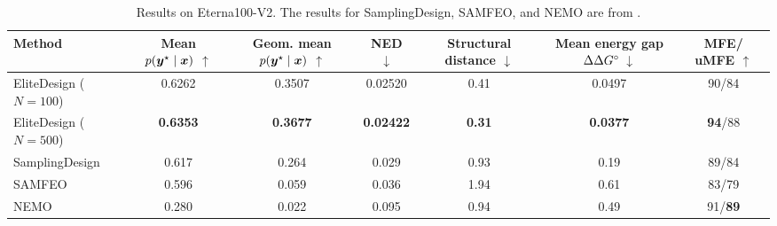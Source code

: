 \begin{table}[H]
\centering\small
\renewcommand{\arraystretch}{1.05}
\setlength{\tabcolsep}{2pt}
\begin{tabular*}{\textwidth}{@{\extracolsep{\fill}}lcccccc@{}}
\toprule
\textbf{Method}
& \shortstack{\textbf{Mean}\\\boldmath$p(\boldsymbol{{y}}^\star\mid\boldsymbol{{x}})$ $\uparrow$}
& \shortstack{\textbf{Geom. mean}\\\boldmath$p(\boldsymbol{{y}}^\star\mid\boldsymbol{{x}})$ $\uparrow$}
& \shortstack{\textbf{NED}\\$\downarrow$}
& \shortstack{\textbf{Structural}\\\textbf{distance} $\downarrow$}
& \shortstack{\textbf{Mean energy}\\\textbf{gap} $\Delta \Delta\,\! G^{\scriptstyle\circ\!}$ $\downarrow$}
& \shortstack{\textbf{MFE/}\\\textbf{uMFE} $\uparrow$} \\
\midrule
EliteDesign ($N=100$) & 0.6262 & 0.3507 & 0.02520 & 0.41 & 0.0497 & 90/84 \\
EliteDesign ($N=500$) & \textbf{0.6353} & \textbf{0.3677} & \textbf{0.02422} & \textbf{0.31} & \textbf{0.0377} & \textbf{94}/88 \\
\midrule
SamplingDesign & 0.617 & 0.264 & 0.029 & 0.93 & 0.19 & 89/84 \\
SAMFEO & 0.596 & 0.059 & 0.036 & 1.94 & 0.61 & 83/79 \\
NEMO & 0.280 & 0.022 & 0.095 & 0.94 & 0.49 & 91/\textbf{89} \\
\bottomrule
\end{tabular*}
\caption{Results on Eterna100-V2. The results for SamplingDesign, SAMFEO, and NEMO are from \citet{tang2026}.}
\label{tab:eterna-v2-results}
\end{table}

